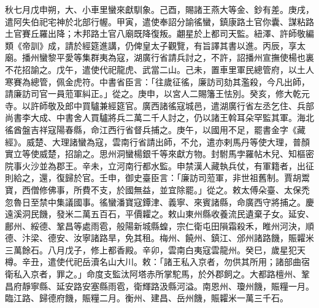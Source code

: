 \begin{pinyinscope}
 秋七月戊申朔，大、小車里蠻來獻馴象。己酉，賜諸王燕大等金、鈔有差。庚戌，遣阿失伯祀宅神於北部行幄。甲寅，遣使奉詔分諭徭蠻，鎮康路土官你囊、謀粘路土官賽丘羅出降；木邦路土官八廟既降復叛。翽星於上都司天監。紐澤、許師敬編類《帝訓》成，請於經筵進講，仍俾皇太子觀覽，有旨譯其書以進。丙辰，享太廟。播州蠻黎平愛等集群夷為寇，湖廣行省請兵討之，不許，詔播州宣撫使楊也裏不花招諭之。戊午，遣使代祀龍虎、武當二山。己未，置車里軍民總管府，以土人寒賽為總管，佩金虎符。中書省臣言：「往歲征徭，廉訪司劾其濫殺，今凡出師，請廉訪司官一員蒞軍糾正。」從之。庚申，以宮人二賜籓王怯別。癸亥，修大乾元寺。以許師敬及郎中買驢兼經筵官。廣西諸徭寇城邑，遣湖廣行省左丞乞住、兵部尚書李大成、中書舍人買驢將兵二萬二千人討之，仍以諸王斡耳朵罕監其軍。海北徭酋盤吉祥寇陽春縣，命江西行省督兵捕之。庚午，以國用不足，罷書金字《藏經》。威楚、大理諸蠻為寇，雲南行省請出師，不允，遣亦剌馬丹等使大理，普顏實立等使威楚，招諭之。思州洞蠻楊銀千等來獻方物。封駙馬孛羅帖木兒、知樞密院事火沙並為郡王。辛未，立河南行都水監。申禁漢人藏執兵仗，有軍籍者，出征則給之，還，復歸於官。壬申，御史臺臣言：「廉訪司蒞軍，非世祖舊制。賈胡鬻寶，西僧修佛事，所費不支，於國無益，並宜除罷。」從之。敕太傅朵臺、太保禿忽魯日至禁中集議國事。徭蠻潘寶寇鐔津、義寧、來賓諸縣，命廣西守將捕之。慶遠溪洞民饑，發米二萬五百石，平價糶之。敕山東州縣收養流民遺棄子女。延安、鄜州、綏德、鞏昌等處雨雹，般陽新城縣蝗，宗仁衛屯田隕霜殺禾，睢州河決，順德、汴梁、德安、汝寧諸路旱，免其租。梅州、饒州、鎮江、邠州諸路饑，賑糶米三萬餘石。八月戊子，修上都香殿。辛卯，雲南白夷寇雲龍州。癸巳，歲星犯天樽。辛丑，遣使代祀岳瀆名山大川。敕：「諸王私入京者，勿供其所用；諸部曲宿衛私入京者，罪之。」命度支監汰阿塔赤所掌駝馬，於外郡飼之。大都路檀州、鞏昌府靜寧縣、延安路安塞縣雨雹，衛輝路汲縣河溢。南恩州、瓊州饑，賑糧一月。臨江路、歸德府饑，賑糧二月。衡州、建昌、岳州饑，賑糶米一萬三千石。




\end{pinyinscope}
